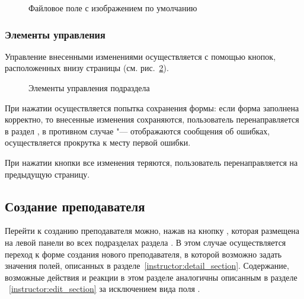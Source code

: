 \begin{itemize}
		\begin{figure}[H]
		\caption{Файловое поле с изображением по умолчанию}
		\label{instructor:edit_icon_image}
		\end{figure}
\end{itemize}

	\subsubsection{Элементы управления}

Управление внесенными изменениями осуществляется с помощью кнопок, расположенных внизу страницы (см. рис.~\ref{instructor:edit_buttons}).
		\begin{figure}[H]
		\caption{Элементы управления подраздела }
		\label{instructor:edit_buttons}
		\end{figure}	
		
При нажатии  осуществляется попытка сохранения формы: если форма заполнена корректно, то внесенные изменения сохраняются, пользователь перенаправляется в раздел , в противном случае "--- отображаются сообщения об ошибках, осуществляется прокрутка к месту первой ошибки. 


При нажатии кнопки  все изменения теряются, пользователь перенаправляется на предыдущую страницу.



\subsection{Создание преподавателя}
Перейти к созданию преподавателя можно, нажав на кнопку , которая размещена на левой панели во всех подразделах раздела . В этом случае осуществляется переход к форме создания нового преподавателя, в которой возможно задать значения полей, описанных в разделе~\ref{instructor:detail_section}. Содержание, возможные действия и реакции в этом разделе аналогичны описанным в разделе ~\ref{instructor:edit_section} за исключением вида поля .



